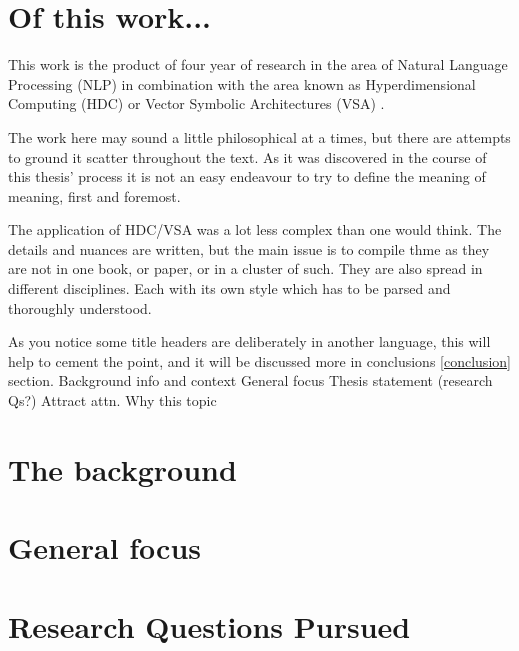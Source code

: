 \section{Of this work...}
This work is the product of four year of research in the area of Natural Language Processing (NLP) in combination with the area known as Hyperdimensional Computing (HDC) \cite{KanervaNAMEHDC} or Vector Symbolic Architectures (VSA) \cite{GaylerNameVSA}.

The work here may sound a little philosophical at a times, but there are attempts to ground it scatter throughout the text. As it was discovered in the course of this thesis' process it is not an easy endeavour to try  to define the meaning of meaning, first and foremost. 

The application of HDC/VSA was a lot less complex than one would think. The details and nuances are written, but the main issue is to compile thme as they are not in one book, or paper, or in a cluster of such. They are also spread in different disciplines. Each with its own style which has to be parsed and thoroughly understood.

As you notice some title headers are deliberately in another language, this will help to cement the point, and it will be discussed more in conclusions \ref{conclusion} section. 
Background info and context
General focus
Thesis statement (research Qs?)
Attract attn.
Why this topic

\section{The background}




\section{General focus}

\section{Research Questions Pursued}


